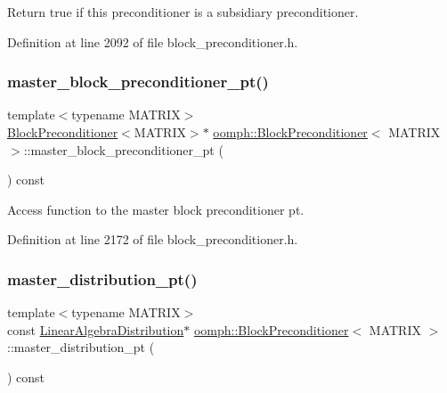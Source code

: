 Return true if this preconditioner is a subsidiary preconditioner. 



Definition at line 2092 of file block\+\_\+preconditioner.\+h.

\mbox{\label{classoomph_1_1BlockPreconditioner_ab84701c65bdfd8d2c14611176e5e6209}} 
\subsubsection{\texorpdfstring{master\+\_\+block\+\_\+preconditioner\+\_\+pt()}{master\_block\_preconditioner\_pt()}}
{\footnotesize\ttfamily template$<$typename M\+A\+T\+R\+IX$>$ \\
\hyperlink{classoomph_1_1BlockPreconditioner}{Block\+Preconditioner}$<$M\+A\+T\+R\+IX$>$$\ast$ \hyperlink{classoomph_1_1BlockPreconditioner}{oomph\+::\+Block\+Preconditioner}$<$ M\+A\+T\+R\+IX $>$\+::master\+\_\+block\+\_\+preconditioner\+\_\+pt (\begin{DoxyParamCaption}{ }\end{DoxyParamCaption}) const\hspace{0.3cm}{\ttfamily [inline]}}



Access function to the master block preconditioner pt. 



Definition at line 2172 of file block\+\_\+preconditioner.\+h.

\mbox{\label{classoomph_1_1BlockPreconditioner_a005d978655022d1a04da7397cf5d0e83}} 
\subsubsection{\texorpdfstring{master\+\_\+distribution\+\_\+pt()}{master\_distribution\_pt()}}
{\footnotesize\ttfamily template$<$typename M\+A\+T\+R\+IX$>$ \\
const \hyperlink{classoomph_1_1LinearAlgebraDistribution}{Linear\+Algebra\+Distribution}$\ast$ \hyperlink{classoomph_1_1BlockPreconditioner}{oomph\+::\+Block\+Preconditioner}$<$ M\+A\+T\+R\+IX $>$\+::master\+\_\+distribution\+\_\+pt (\begin{DoxyParamCaption}{ }\end{DoxyParamCaption}) const\hspace{0.3cm}{\ttfamily [inline]}}



